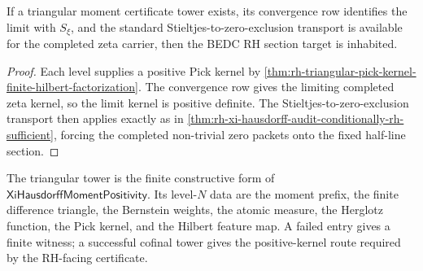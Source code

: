 \begin{theorem}
\label{thm:rh-triangular-certificate-tower-conditionally-rh-sufficient}
If a triangular moment certificate tower exists, its convergence row
identifies the limit with $S_{\xi}$, and the standard
Stieltjes-to-zero-exclusion transport is available for the completed zeta
carrier, then the BEDC RH section target is inhabited.
\end{theorem}

\begin{proof}
Each level supplies a positive Pick kernel by
\autoref{thm:rh-triangular-pick-kernel-finite-hilbert-factorization}.
The convergence row gives the limiting completed zeta kernel, so the
limit kernel is positive definite. The
Stieltjes-to-zero-exclusion transport then applies exactly as in
\autoref{thm:rh-xi-hausdorff-audit-conditionally-rh-sufficient}, forcing
the completed non-trivial zero packets onto the fixed half-line section.
\end{proof}

\begin{principle}
\label{prin:rh-triangular-moment-tower-status}
The triangular tower is the finite constructive form of
$\mathsf{XiHausdorffMomentPositivity}$. Its level-$N$ data are the moment
prefix, the finite difference triangle, the Bernstein weights, the
atomic measure, the Herglotz function, the Pick kernel, and the Hilbert
feature map. A failed entry gives a finite witness; a successful cofinal
tower gives the positive-kernel route required by the RH-facing
certificate.
\end{principle}
